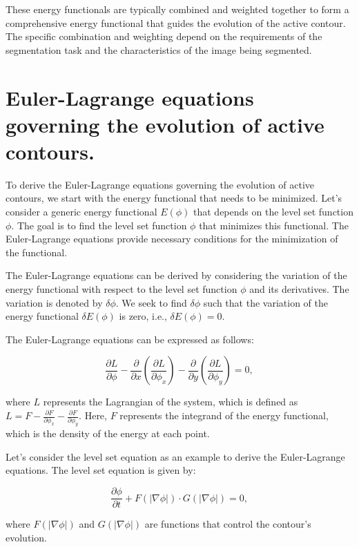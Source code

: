 \documentclass[]{report}
\begin{document}
These energy functionals are typically combined and weighted together to form a comprehensive energy functional that guides the evolution of the active contour. The specific combination and weighting depend on the requirements of the segmentation task and the characteristics of the image being segmented.
\section*{Euler-Lagrange equations governing the evolution of active contours.}
To derive the Euler-Lagrange equations governing the evolution of active contours, we start with the energy functional that needs to be minimized. Let's consider a generic energy functional $E(\phi)$ that depends on the level set function $\phi$. The goal is to find the level set function $\phi$ that minimizes this functional. The Euler-Lagrange equations provide necessary conditions for the minimization of the functional.

The Euler-Lagrange equations can be derived by considering the variation of the energy functional with respect to the level set function $\phi$ and its derivatives. The variation is denoted by $\delta\phi$. We seek to find $\delta\phi$ such that the variation of the energy functional $\delta E(\phi)$ is zero, i.e., $\delta E(\phi) = 0$.

The Euler-Lagrange equations can be expressed as follows:

\begin{equation}
    \frac{\partial L}{\partial \phi} - \frac{\partial}{\partial x}\left(\frac{\partial L}{\partial \phi_x}\right) - \frac{\partial}{\partial y}\left(\frac{\partial L}{\partial \phi_y}\right) = 0,
\end{equation}

where $L$ represents the Lagrangian of the system, which is defined as $L = F - \frac{\partial F}{\partial \phi_x} - \frac{\partial F}{\partial \phi_y}$. Here, $F$ represents the integrand of the energy functional, which is the density of the energy at each point.

Let's consider the level set equation as an example to derive the Euler-Lagrange equations. The level set equation is given by:

\begin{equation}
    \frac{\partial\phi}{\partial t} + F(\lvert\nabla\phi\rvert) \cdot G(\lvert\nabla\phi\rvert) = 0,
\end{equation}

where $F(\lvert\nabla\phi\rvert)$ and $G(\lvert\nabla\phi\rvert)$ are functions that control the contour's evolution.
\end{document}
